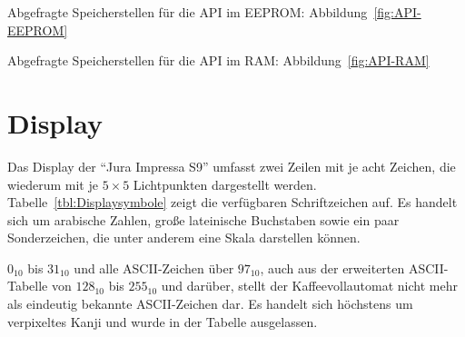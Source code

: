 \todo
Abgefragte Speicherstellen für die \ac{API} im \ac{EEPROM}: Abbildung~\ref{fig:API-EEPROM}

Abgefragte Speicherstellen für die \ac{API} im \ac{RAM}: Abbildung~\ref{fig:API-RAM}
\todo

\section{Display}\label{sec:Display}
Das Display der "`Jura Impressa S9"' umfasst zwei Zeilen mit je acht Zeichen, die wiederum mit je $5 \times 5$ Lichtpunkten dargestellt werden.
Tabelle~\ref{tbl:Displaysymbole} zeigt die verfügbaren Schriftzeichen auf.
Es handelt sich um arabische Zahlen, große lateinische Buchstaben sowie ein paar Sonderzeichen, die unter anderem eine Skala darstellen können.

$0_{10}$ bis $31_{10}$ und alle \ac{ASCII}-Zeichen über $97_{10}$, auch aus der erweiterten \ac{ASCII}-Tabelle von $128_{10}$ bis $255_{10}$ und darüber, stellt der Kaffeevollautomat nicht mehr als eindeutig bekannte \ac{ASCII}-Zeichen dar.
Es handelt sich höchstens um verpixeltes Kanji und wurde in der Tabelle ausgelassen.


